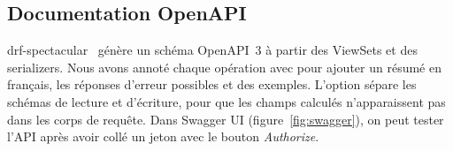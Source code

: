 \subsection{Documentation OpenAPI}

drf-spectacular~\cite{spectacular} génère un schéma OpenAPI~3 à partir des ViewSets et des serializers. Nous avons annoté chaque opération avec  pour ajouter un résumé en français, les réponses d'erreur possibles et des exemples. L'option  sépare les schémas de lecture et d'écriture, pour que les champs calculés n'apparaissent pas dans les corps de requête. Dans Swagger UI (figure~\ref{fig:swagger}), on peut tester l'API après avoir collé un jeton avec le bouton \emph{Authorize}.

